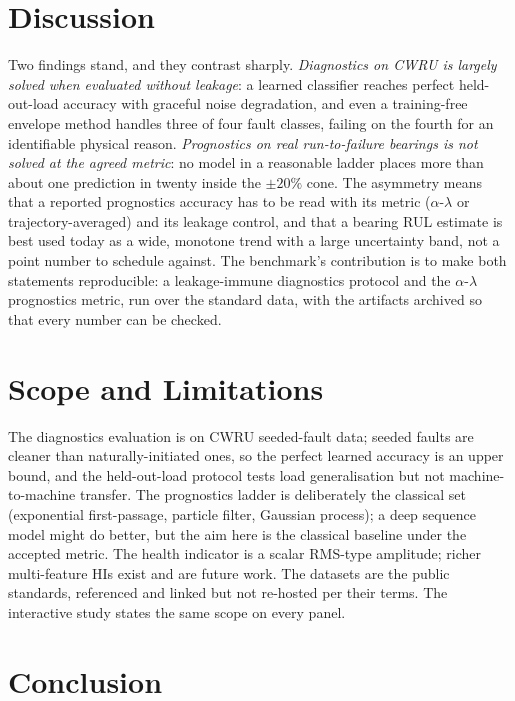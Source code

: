 \documentclass[journal]{IEEEtran}
\begin{document}
\section{Discussion}\label{sec:discuss}

Two findings stand, and they contrast sharply. \emph{Diagnostics on CWRU is largely solved when evaluated
without leakage}: a learned classifier reaches perfect held-out-load accuracy with graceful noise degradation,
and even a training-free envelope method handles three of four fault classes, failing on the fourth for an
identifiable physical reason. \emph{Prognostics on real run-to-failure bearings is not solved at the agreed metric}: no model in
a reasonable ladder places more than about one prediction in twenty inside the $\pm20\%$ cone. The asymmetry
means that a reported prognostics accuracy has to be read with its metric ($\alpha$-$\lambda$ or
trajectory-averaged) and its leakage control, and that a bearing RUL estimate is best used today as a wide,
monotone trend with a large uncertainty band, not a point number to schedule against. The
benchmark's contribution is to make both statements reproducible: a leakage-immune diagnostics protocol and the
$\alpha$-$\lambda$ prognostics metric, run over the standard data, with the artifacts archived so that every number
can be checked.

\section{Scope and Limitations}\label{sec:limits}

The diagnostics evaluation is on CWRU seeded-fault data; seeded faults are cleaner than
naturally-initiated ones, so the perfect learned accuracy is an upper bound, and the held-out-load protocol tests
load generalisation but not machine-to-machine transfer. The prognostics ladder is deliberately the classical set
(exponential first-passage, particle filter, Gaussian process); a deep sequence model might do better, but the
aim here is the classical baseline under the accepted metric. The health indicator is a scalar RMS-type amplitude; richer
multi-feature HIs exist and are future work. The datasets are the public standards, referenced and linked but not
re-hosted per their terms. The interactive study states the same scope on every panel.

\section{Conclusion}
\end{document}
